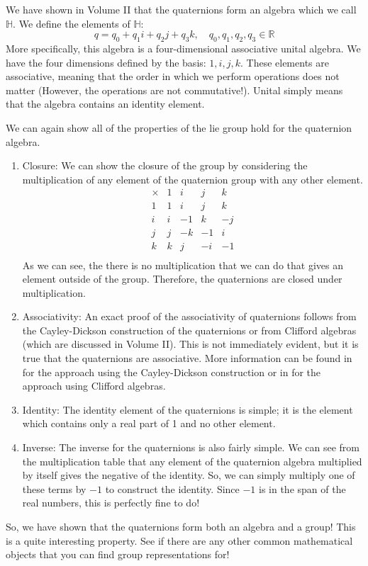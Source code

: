 \begin{example}
We have shown in Volume II that the quaternions form an algebra which we call $\mathbb{H}$. We define the elements of $\mathbb{H}$:
$$q=q_0+q_1i+q_2j+q_3k ,\quad q_0,q_1,q_2,q_3\in\mathbb{R}$$
    More specifically, this algebra is a four-dimensional associative unital algebra. We have the four dimensions defined by the basis: $1,i,j,k$. These elements are associative, meaning that the order in which we perform operations does not matter (However, the operations are not commutative!). Unital simply means that the algebra contains an identity element.

    We can again show all of the properties of the \gls{lie group} hold for the quaternion algebra.

    \begin{enumerate}
        \item Closure: We can show the closure of the group by considering the multiplication of any element of the quaternion group with any other element.
$$\begin{array}{c|cccc}
     \times&1&i&j&k  \\
     \hline
     1&1&i&j&k\\
     i&i&-1&k&-j\\
     j&j&-k&-1&i\\
     k&k&j&-i&-1\\
\end{array}$$
As we can see, the there is no multiplication that we can do that gives an element outside of the group. Therefore, the quaternions are closed under multiplication.
\item Associativity: An exact proof of the associativity of quaternions follows from the Cayley-Dickson construction of the quaternions or from Clifford algebras (which are discussed in Volume II). This is not immediately evident, but it is true that the quaternions are associative. More information can be found in \cite{michael_penn_climbing_2023} for the approach using the Cayley-Dickson construction or in \cite{sudgylacmoe_swift_2020} for the approach using Clifford algebras.
\item Identity: The identity element of the quaternions is simple; it is the element which contains only a real part of 1 and no other element.
\item Inverse: The inverse for the quaternions is also fairly simple. We can see from the multiplication table that any element of the quaternion algebra multiplied by itself gives the negative of the identity. So, we can simply multiply one of these terms by $-1$ to construct the identity. Since $-1$ is in the span of the real numbers, this is perfectly fine to do!


    \end{enumerate}
    So, we have shown that the quaternions form both an algebra and a group! This is a quite interesting property. See if there are any other common mathematical objects that you can find group representations for!
\end{example}

